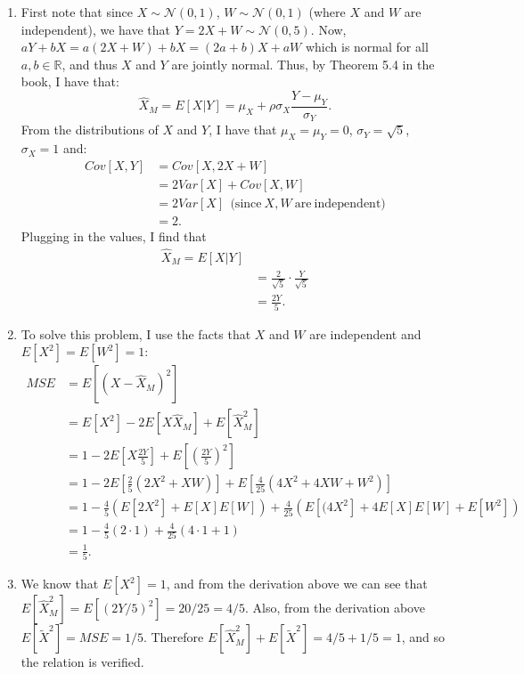 \begin{problem}{5} $ $

\begin{enumerate}
 
 \item  First note that since $X \sim \mathcal N(0, 1)$, $W \sim \mathcal N(0, 1)$ (where $X$ and $W$ are independent), we have that $Y=2X+W \sim \mathcal N(0, 5)$.  Now, $aY+bX = a(2X+W)+bX = (2a+b)X+aW$ which is normal for all $a, b \in \mathbb R$, and thus $X$ and $Y$ are jointly normal.  Thus, by Theorem 5.4 in the book, I have that:
\begin{equation*}
\hat X_M = E[X|Y] = \mu_X+\rho \sigma_X \frac{Y-\mu_Y}{\sigma_Y}.
\end{equation*}
From the distributions of $X$ and $Y$, I have that $\mu_X =\mu_Y=0$, $\sigma_Y=\sqrt{5}$, $\sigma_X=1$ and:
\begin{align*}
Cov[X, Y] &= Cov[X, 2X+W] \\
& = 2Var[X]+Cov[X, W] \\
&= 2Var[X] ~~\mathrm{(since~}X, W~\mathrm{are~independent)} \\
& = 2.
\end{align*}
Plugging in the values, I find that 
\begin{align*}
\hat X_M = E[X|Y] \\
&= \frac{2}{\sqrt{5}}\cdot \frac{Y}{\sqrt{5}} \\
&=\frac{2Y}{5}.
\end{align*}

\item To solve this problem, I use the facts that $X$ and $W$ are independent and $E[X^2]=E[W^2] =1$:
\begin{align*}
MSE &= E[(X-\hat X_M)^2] \\
&=E[X^2]-2E[X\hat X_M]+E[\hat X_M^2] \\
&=1-2 E\left [X \frac{2Y}{5}\right] +E\left[\left(\frac{2Y}{5}\right)^2\right] \\
&=1-2 E\left [\frac{2}{5}(2X^2+XW)\right] +E\left [\frac{4}{25}(4X^2+4XW+W^2)\right] \\
&=1-\frac{4}{5} \left (E[2X^2]+E[X]E[W] \right ) +\frac{4}{25} \left ( E[(4X^2]+4E[X]E[W]+E[W^2] \right ) \\
&=1-\frac{4}{5} \left (2\cdot 1 \right ) +\frac{4}{25} \left ( 4\cdot 1+1 \right ) \\
& = \frac{1}{5}.
\end{align*}

\item We know that $E[X^2] =1$, and from the derivation above we can see that $E[\hat X_M^2] = E[(2Y/5)^2] = 20/25=4/5$.  Also, from the derivation above $E[\tilde X^2] = MSE = 1/5$.  Therefore $E[\hat X_M^2]+E[\tilde X^2] = 4/5+1/5 =1$, and so the relation is verified.

 
\end{enumerate}
\end{problem}




